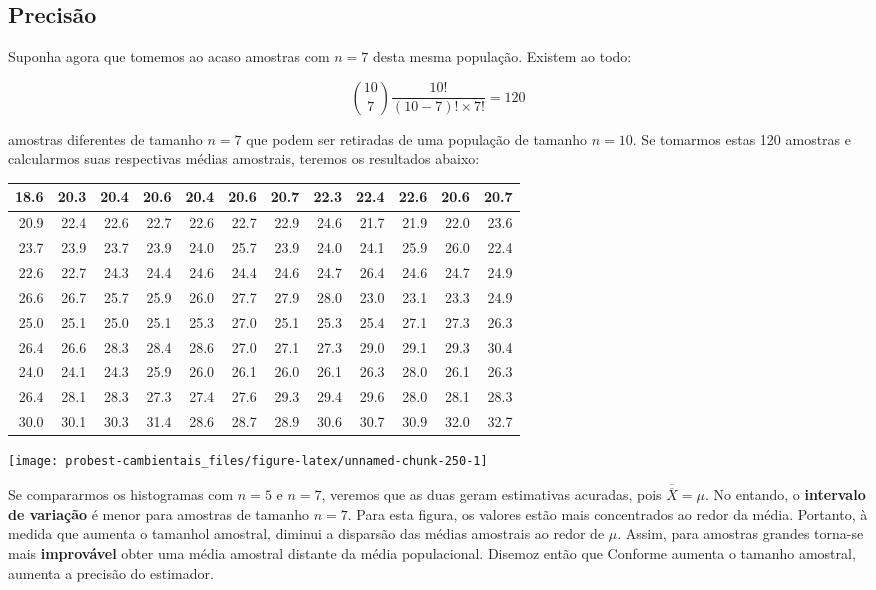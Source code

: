 \documentclass[
]{book}
\begin{document}
\hypertarget{precisuxe3o}{%
\subsection{Precisão}\label{precisuxe3o}}

Suponha agora que tomemos ao acaso amostras com \(n = 7\) desta mesma população. Existem ao todo:

\[{{10}\choose{7}} \frac{10!}{(10-7)! \times 7!} = 120\]

amostras diferentes de tamanho \(n = 7\) que podem ser retiradas de uma população de tamanho \(n = 10\). Se tomarmos estas 120 amostras e calcularmos suas respectivas médias amostrais, teremos os resultados abaixo:

\begin{tabular}{r|r|r|r|r|r|r|r|r|r|r|r}
\hline
18.6 & 20.3 & 20.4 & 20.6 & 20.4 & 20.6 & 20.7 & 22.3 & 22.4 & 22.6 & 20.6 & 20.7\\
\hline
20.9 & 22.4 & 22.6 & 22.7 & 22.6 & 22.7 & 22.9 & 24.6 & 21.7 & 21.9 & 22.0 & 23.6\\
\hline
23.7 & 23.9 & 23.7 & 23.9 & 24.0 & 25.7 & 23.9 & 24.0 & 24.1 & 25.9 & 26.0 & 22.4\\
\hline
22.6 & 22.7 & 24.3 & 24.4 & 24.6 & 24.4 & 24.6 & 24.7 & 26.4 & 24.6 & 24.7 & 24.9\\
\hline
26.6 & 26.7 & 25.7 & 25.9 & 26.0 & 27.7 & 27.9 & 28.0 & 23.0 & 23.1 & 23.3 & 24.9\\
\hline
25.0 & 25.1 & 25.0 & 25.1 & 25.3 & 27.0 & 25.1 & 25.3 & 25.4 & 27.1 & 27.3 & 26.3\\
\hline
26.4 & 26.6 & 28.3 & 28.4 & 28.6 & 27.0 & 27.1 & 27.3 & 29.0 & 29.1 & 29.3 & 30.4\\
\hline
24.0 & 24.1 & 24.3 & 25.9 & 26.0 & 26.1 & 26.0 & 26.1 & 26.3 & 28.0 & 26.1 & 26.3\\
\hline
26.4 & 28.1 & 28.3 & 27.3 & 27.4 & 27.6 & 29.3 & 29.4 & 29.6 & 28.0 & 28.1 & 28.3\\
\hline
30.0 & 30.1 & 30.3 & 31.4 & 28.6 & 28.7 & 28.9 & 30.6 & 30.7 & 30.9 & 32.0 & 32.7\\
\hline
\end{tabular}

\begin{center}\texttt{[image: probest-cambientais\_files/figure-latex/unnamed-chunk-250-1]} \end{center}

Se compararmos os histogramas com \(n = 5\) e \(n = 7\), veremos que as duas geram estimativas acuradas, pois \(\overline{\overline{X}} = \mu\). No entando, o \textbf{intervalo de variação} é menor para amostras de tamanho \(n = 7\). Para esta figura, os valores estão mais concentrados ao redor da média. Portanto, à medida que aumenta o tamanhol amostral, diminui a disparsão das médias amostrais ao redor de \(\mu\). Assim, para amostras grandes torna-se mais \textbf{improvável} obter uma média amostral distante da média populacional. Disemoz então que Conforme aumenta o tamanho amostral, aumenta a precisão do estimador.
\end{document}
